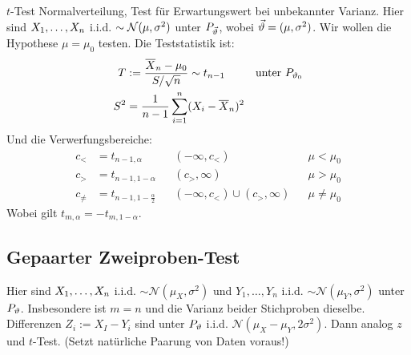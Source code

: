 \begin{definition}{$t$-Test}
  \color{red} Normalverteilung, Test für Erwartungswert bei unbekannter Varianz. \color{black} Hier sind
  $X_1, \dots, X_n$ i.i.d. $\sim \mathcal{N} (\mu, \sigma^2)$ unter $P_{\vec{\vartheta}}$, wobei
  $\vec{\vartheta} = (\mu, \sigma^2)$. Wir wollen die Hypothese $\mu = \mu_0$ testen.
  Die Teststatistik ist:
  \begin{align*}
    T   & := \frac{\overline{X}_n - \mu_0}{S / \sqrt{n}} \sim t_{n-1}
        &                                                             & \text{unter } P_{\vartheta_0} \\
    S^2 & = \frac{1}{n-1} \sum_{i = 1}^n  (X_i - \overline{X}_n)^2
  \end{align*}
  Und die Verwerfungsbereiche:
  \begin{align*}
    c_<      & = t_{n-1, \alpha}               &  & (-\infty, c_<)                     &  & \mu < \mu_0    \\
    c_>      & = t_{n-1, 1 - \alpha}           &  & (c_>, \infty)                      &  & \mu > \mu_0    \\
    c_{\neq} & = t_{n-1, 1 - \frac{\alpha}{2}} &  & (-\infty, c_<) \cup  (c_>, \infty) &  & \mu \neq \mu_0
  \end{align*}
  Wobei gilt $t_{m, \alpha} = -t_{m, 1 - \alpha}$.
\end{definition}
\subsection{Gepaarter Zweiproben-Test}
Hier sind $X_1, \dots, X_n$ i.i.d. $\sim \mathcal{N} (\mu_X, \sigma^2)$ und
$Y_1, \dots, Y_n$ i.i.d. $\sim \mathcal{N} (\mu_Y, \sigma^2)$ unter $P_\vartheta$.
Insbesondere ist $m = n$ und die Varianz beider Stichproben dieselbe.
Differenzen $Z_i := X_I - Y_i$ sind unter $P_\vartheta$ i.i.d. $\mathcal{N} (\mu_X -
  \mu_Y, 2 \sigma^2)$. Dann analog $z$ und $t$-Test. (Setzt natürliche Paarung
von Daten voraus!)
